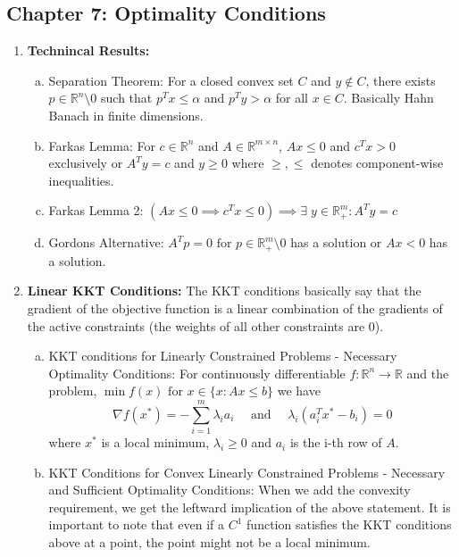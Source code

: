 \documentclass{article}
\begin{document}
\subsection*{Chapter 7: Optimality Conditions}
\begin{enumerate}
    \item \textbf{Technincal Results:}
    \begin{enumerate}[a.]
        \item Separation Theorem: For a closed convex set \(C\) and \(y \notin C\), there exists \(p \in \mathbb{R}^n\setminus 0 \) such that \(p^Tx \leq \alpha\) and \(p^Ty > \alpha\) for all \(x \in C\). Basically Hahn Banach in finite dimensions.
        \item Farkas Lemma: For \(c \in \mathbb{R}^n\) and \(A \in \mathbb{R}^{m \times n} \), \(Ax \leq 0\) and \(c^Tx > 0\) exclusively or \(A^Ty = c\) and \(y \geq 0\) where \(\geq, \leq\) denotes component-wise inequalities.
        \item Farkas Lemma 2: \(\left(Ax \leq 0 \implies c^Tx \leq 0\right)\implies \exists \; y \in \mathbb{R}^m_+:A^Ty = c\)
        \item Gordons Alternative: \(A^Tp= 0 \text{ for } p \in \mathbb{R}^m_+\setminus0 \) has a solution or \(Ax<0\) has a solution.
    \end{enumerate}
    \item \textbf{Linear KKT Conditions:} The KKT conditions basically say that the gradient of the objective function is a linear combination of the gradients of the active constraints (the weights of all other constraints are 0).
    \begin{enumerate}[a.]
        \item KKT conditions for Linearly Constrained Problems - Necessary Optimality Conditions: For continuously differentiable \(f : \mathbb{R}^n \to \mathbb{R}\) and the problem, \(\min f(x) \text{ for } x \in \{x : Ax\leq b\}\) we have
        \[
        \nabla f(x^*) = -  \sum^{m}_{i=1} \lambda_i a_i \quad \text{ and } \quad 
        \lambda_i(a_i^Tx^* - b_i) = 0
        \]
        where \(x^*\) is a local minimum, \(\lambda_i \geq 0\) and \(a_i\) is the i-th row of \(A\).
        
        \item KKT Conditions for Convex Linearly Constrained Problems - Necessary and Sufficient Optimality Conditions: When we add the convexity requirement, we get the leftward implication of the above statement. It is important to note that even if a \(C^1\) function satisfies the KKT conditions above at a point, the point might not be a local minimum.
        

\end{enumerate}
\end{enumerate}
\end{document}
